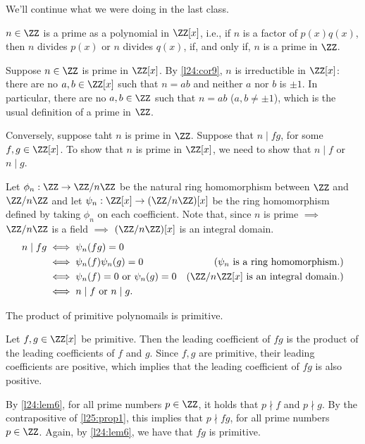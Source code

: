 
We'll continue what we were doing in the last class.

\begin{prop}\label{l25:prop1}
	$n \in \ZZ$ is a prime as a polynomial in $\ZZ[x]$, i.e., if $n$ is a factor of $p(x)q(x)$, then $n$ divides $p(x)$ or $n$ divides $q(x)$, if, and only if, $n$ is a prime in $\ZZ$. 
\end{prop}

\begin{dem}
	Suppose $n \in \ZZ$ is prime in $\ZZ[x]$. By \cref{l24:cor9}, $n$ is irreductible in $\ZZ[x]$: there are no $a, b \in \ZZ[x]$ such that $n = ab$ and neither $a$ nor $b$ is $\pm 1$. In particular, there are no $a, b \in \ZZ$ such that $n = ab$ ($a, b \neq \pm 1$), which is the usual definition of a prime in $\ZZ$.

	Conversely, suppose taht $n$ is prime in $\ZZ$. Suppose that $n \mid fg$, for some  $f, g \in \ZZ[x]$. To show that $n$ is prime in $\ZZ[x]$, we need to show that $n\mid f$ or $n\mid g$.
	
	Let $\phi_n: \ZZ \to \ZZ/n\ZZ$ be the natural ring homomorphism between $\ZZ$ and $\ZZ/n\ZZ$ and let $\psi_n: \ZZ[x] \to (\ZZ/n\ZZ)[x]$ be the ring homomorphism defined by taking $\phi_n$ on each coefficient.
	Note that, since $n$ is prime $\implies$ $\ZZ/n\ZZ$ is a field $\implies$ $(\ZZ/n\ZZ)[x]$ is an integral domain.
	\begin{align*}
		n \mid fg & \iff \psi_n(fg) = 0 \\
				  & \iff \psi_n(f)\psi_n(g) = 0 & \text{($\psi_n$ is a ring homomorphism.)} \\
				  & \iff \psi_n(f) = 0 \text{\ or\ } \psi_n(g) = 0 & \text{($\ZZ/n\ZZ[x]$ is an integral domain.)}\\
				  & \iff n \mid f \text{\ or\ } n \mid g.
	\end{align*}
\end{dem}

\begin{lem}
	The product of primitive polynomails is primitive.
\end{lem}

\begin{dem}
	Let $f, g \in \ZZ[x]$ be primitive. Then the leading coefficient of $fg$ is the product of the leading coefficients of $f$ and $g$. Since $f, g$ are primitive, their leading coefficients are positive, which implies that the leading coefficient of $fg$ is also positive.

	By \cref{l24:lem6}, for all prime numbers $p \in \ZZ$, it holds that $p \nmid f$ and $p \nmid g$.
	By the contrapositive of \cref{l25:prop1}, this implies that $p \nmid fg$, for all prime numbers $p \in \ZZ$.  Again, by \cref{l24:lem6}, we have that $fg$ is primitive.
\end{dem}

